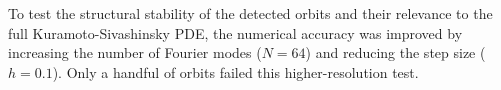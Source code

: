 To test the structural stability of the detected orbits and their
relevance to the full Kuramoto-Sivashinsky PDE, the numerical
accuracy was improved by increasing the number of
Fourier modes ($N = 64$) and reducing the step size ($h = 0.1$).
Only a handful of orbits failed this higher-resolution test.

